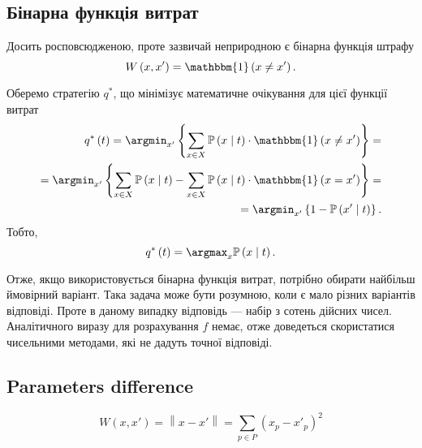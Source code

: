 \subsection{Бінарна функція витрат}

Досить росповсюдженою, проте зазвичай неприродною є бінарна функція штрафу
\begin{equation*}
  W \left( x, x' \right)
  = \mathbbm{1} \left( x \neq x' \right).
\end{equation*}

Оберемо стратегію $q^*$,
що мінімізує математичне очікування для цієї функції витрат
\begin{equation*}
  \begin{split}
    q^* \left( t \right)
    = \argmin_{x'} \left\{
      \sum\limits_{x \in X}
        \mathbb{P} \left( x \;\middle|\;  t \right)
        \cdot \mathbbm{1} \left( x \neq x' \right)
      \right\} = \\
    = \argmin_{x'} \left\{
      \sum\limits_{x \in X}
        \mathbb{P} \left( x \;\middle|\;  t \right)
      - \sum\limits_{x \in X}
        \mathbb{P} \left( x \;\middle|\;  t \right)
        \cdot \mathbbm{1} \left( x = x' \right)
      \right\} = \\
    = \argmin_{x'} \left\{
      1 - \mathbb{P} \left( x' \;\middle|\;  t \right)
      \right\}.
  \end{split}
\end{equation*}
Тобто,
\begin{equation*}
  q^* \left( t \right)
  = \argmax_x \mathbb{P} \left( x \;\middle|\;  t \right).
\end{equation*}

Отже, якщо використовується бінарна функція витрат,
потрібно обирати найбільш ймовірний варіант.
Така задача може бути розумною, коли є мало різних варіантів відповіді.
Проте в даному випадку відповідь --- набір з сотень дійсних чисел.
Аналітичного виразу для розрахування $f$ немає,
отже доведеться скористатися чисельними методами,
які не дадуть точної відповіді.

\subsection{Parameters difference}

\begin{equation*}
  W \left( x, x' \right)
  = \left\| x - x' \right\|
  = \sum_{p \in P} \left( x_p - x'_p \right)^2
\end{equation*}

